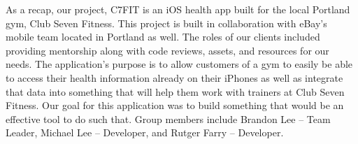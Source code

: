 As a recap, our project, C7FIT is an iOS health app built for the local Portland gym, Club Seven Fitness. This project is built in collaboration with eBay's mobile team located in Portland as well. The roles of our clients included providing mentorship along with code reviews, assets, and resources for our needs. The application's purpose is to allow customers of a gym to easily be able to access their health information already on their iPhones as well as integrate that data into something that will help them work with trainers at Club Seven Fitness. Our goal for this application was to build something that would be an effective tool to do such that. Group members include Brandon Lee – Team Leader, Michael Lee – Developer, and Rutger Farry – Developer.